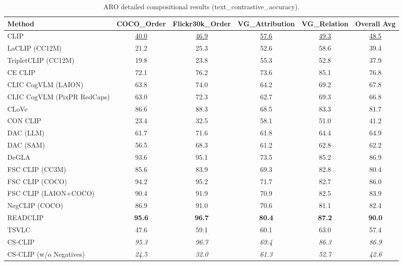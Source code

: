 \begin{table}[t]
  \centering
  \scriptsize
  \caption{ARO detailed compositional results (text_contrastive_accuracy).}
  \label{tab:ARO_detailed}
  \begin{adjustbox}{max width=\textwidth}
  \setlength{\tabcolsep}{2pt}
  \begin{tabular}{p{5cm}c|c|c|c|c}
    \toprule
    Method & COCO\_Order & Flickr30k\_Order & VG\_Attribution & VG\_Relation & Overall Avg \\
    \midrule
    CLIP & \underline{40.0} & \underline{46.9} & \underline{57.6} & \underline{49.3} & \underline{48.5} \\
    \midrule
    LaCLIP (CC12M) & 21.2 & 25.3 & 52.6 & 58.6 & 39.4 \\
    TripletCLIP (CC12M) & 19.8 & 23.8 & 55.3 & 52.8 & 37.9 \\
    \midrule
    CE CLIP & 72.1 & 76.2 & 73.6 & 85.1 & 76.8 \\
    CLIC CogVLM (LAION) & 63.8 & 74.0 & 64.2 & 69.2 & 67.8 \\
    CLIC CogVLM (PixPR RedCaps) & 63.0 & 72.3 & 62.7 & 69.3 & 66.8 \\
    CLoVe & 86.6 & 88.3 & 68.5 & 83.3 & 81.7 \\
    CON CLIP & 23.4 & 32.5 & 58.1 & 51.0 & 41.2 \\
    DAC (LLM) & 61.7 & 71.6 & 61.8 & 64.4 & 64.9 \\
    DAC (SAM) & 56.5 & 68.3 & 61.2 & 62.8 & 62.2 \\
    DeGLA & 93.6 & 95.1 & 73.5 & 85.2 & 86.9 \\
    FSC CLIP (CC3M) & 85.6 & 83.9 & 69.3 & 82.8 & 80.4 \\
    FSC CLIP (COCO) & 94.2 & 95.2 & 71.7 & 82.7 & 86.0 \\
    FSC CLIP (LAION+COCO) & 90.4 & 91.9 & 70.9 & 82.5 & 83.9 \\
    NegCLIP (COCO) & 86.9 & 91.0 & 70.6 & 81.1 & 82.4 \\
    READCLIP & \textbf{95.6} & \textbf{96.7} & \textbf{80.4} & \textbf{87.2} & \textbf{90.0} \\
    TSVLC & 47.6 & 59.1 & 60.1 & 63.0 & 57.4 \\
    \midrule
    CS-CLIP & \emph{95.3} & \emph{96.7} & \emph{69.4} & \emph{86.3} & \emph{86.9} \\
    CS-CLIP (w/o Negatives) & \emph{24.5} & \emph{32.0} & \emph{61.3} & \emph{52.7} & \emph{42.6} \\
    \bottomrule
  \end{tabular}
  \end{adjustbox}
\end{table}
